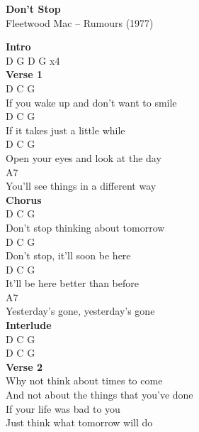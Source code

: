 \documentclass[a4paper]{article}
\begin{document}
    \begin{center}
        \textbf{Don't Stop}
        ~\\
        Fleetwood Mac -- Rumours (1977)
    \end{center}
    {
        \scriptsize
        \textbf{Intro}
        ~\\
        {
            \cutive
            \obeyspaces
D G  D G  x4
\\

        }
        \textbf{Verse 1}
        ~\\
        {
            \cutive
            \obeyspaces
D      C           G
\\
If you wake up and don't want to smile
\\
D     C            G
\\
If it takes just a little while
\\
D         C        G
\\
Open your eyes and look at the day
\\
A7
\\
You'll see things in a different way
\\

        }
        \textbf{Chorus}
        ~\\
        {
            \cutive
            \obeyspaces
D     C     G
\\
Don't stop thinking about tomorrow
\\
D     C     G
\\
Don't stop, it'll soon be here
\\
D        C    G
\\
It'll be here better than before
\\
A7
\\
Yesterday's gone, yesterday's gone
\\

        }
        \textbf{Interlude}
        ~\\
        {
            \cutive
            \obeyspaces
D   C    G
\\
D   C    G
\\

        }
        \textbf{Verse 2}
        ~\\
        {
            \cutive
            \obeyspaces
Why not think about times to come
\\
And not about the things that you've done
\\
If your life was bad to you
\\
Just think what tomorrow will do
\\

}}
\end{document}
